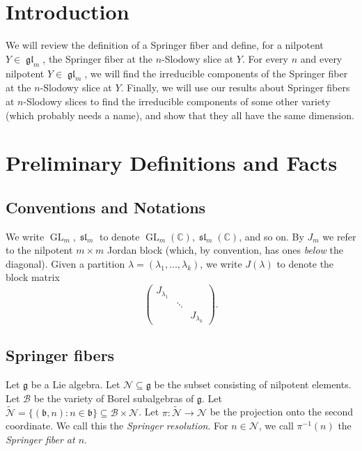 \documentclass[12pt,psamsfonts]{article}
\DeclareMathOperator{\GL}{GL}
\DeclareMathOperator{\gl}{\mathfrak{gl}}
\DeclareMathOperator{\spl}{\mathfrak{sl}}
\begin{document}

\section{Introduction}
We will review the definition of a Springer fiber and define, for a nilpotent \(Y \in \gl_m\), the Springer fiber at the \(n\)-Slodowy slice at \(Y\).
For every \(n\) and every nilpotent \(Y \in \gl_m\), we will find the irreducible components of the Springer fiber at the \(n\)-Slodowy slice at \(Y\).
Finally, we will use our results about Springer fibers at \(n\)-Slodowy slices to find the irreducible components of some other variety (which probably needs a name), and show that they all have the same dimension.

\section{Preliminary Definitions and Facts}
\subsection{Conventions and Notations}
We write \(\GL_m, \spl_m\) to denote \(\GL_m(\mathbb{C}), \spl_m(\mathbb{C})\), and so on.
By \(J_m\) we refer to the nilpotent \(m \times m\) Jordan block (which, by convention, has ones \emph{below} the diagonal).
Given a partition \(\lambda = (\lambda_1, ..., \lambda_k)\), we write \(J(\lambda)\) to denote the block matrix
\[\begin{pmatrix}
    J_{\lambda_1} \\
    & \ddots \\
    & & J_{\lambda_k}
\end{pmatrix}.\]



\subsection{Springer fibers}
Let \(\mathfrak{g}\) be a Lie algebra.
Let \(\mathcal{N} \subseteq \mathfrak{g}\) be the subset consisting of nilpotent elements.
Let \(\mathcal{B}\) be the variety of Borel subalgebras of \(\mathfrak{g}\).
Let \(\widetilde{\mathcal{N}} = \{(\mathfrak{b}, n) : n \in \mathfrak{b}\} \subseteq \mathcal{B} \times \mathcal{N}\).
Let \(\pi : \widetilde{\mathcal{N}} \to \mathcal{N}\) be the projection onto the second coordinate.
We call this the \emph{Springer resolution}.
For \(n \in \mathcal{N}\), we call \(\pi^{-1}(n)\) the \emph{Springer fiber at \(n\)}.
\end{document}
